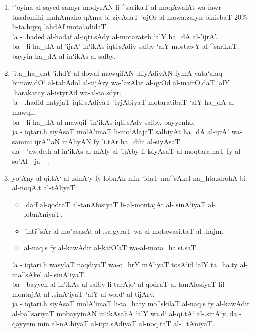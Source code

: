 \begin{enumerate}
    \item `"oyina al-sayed samyr modyrAN li-^sarikaT al-moqAwalAt wa-fawr
        tasalomihi mahAmaho qAma bi-ziyAdaT 'ojOr al-mowa.zafyn binisbaT 20\%
        li-ta.hqyq 'ahdAf mota`adidaT.\\
        'a - .haded al-hadaf al-iqti.sAdy al-motarateb `alY ha_dA al-'ijrA'.\\
        ba - li-ha_dA al-'ijrA' in`ikAs iqti.sAdiy salby `alY mostawY
            al-^sarikaT. bayyin ha_dA al-in`ikAs al-salby.

    \item 'ita_ha_dat 'i.hdY al-dowal mawqifAN .hiyAdiyAN fymA yata`alaq 
        bimaw.dO` al-tabAdol al-tijAry wa-'azAlat al-qyOd al-mafrO.daT `alY
        .harakatay al-istyrAd wa-al-ta.sdyr.\\
        'a - .hadid natyjaT iqti.sAdiyaT 'iyjAbiyaT motaratibaT `alY ha_dA
            al-mawqif.\\
        ba - li-ha_dA al-mawqif 'in`ikAs iqti.sAdy salby. bayyenho.\\
        ja - iqtari.h siyAsaT molA'imaT li-mo`AlajaT salbiyAt ha_dA al-ijrA'
            wa-sammi ijrA'"aN mAliyAN fy 'i.tAr ha_dihi al-siyAsaT.\\
        da - 'aw.de.h al-in`ikAs al-mAly al-'ijAby li-lsiyAsaT al-moqtara.haT
            fy al-so'Al - ja - .

    \item yo`Any al-qi.tA` al-.sinA`y fy lobnAn min `idaT ma^sAkel na_hta.sirohA
        bi-al-noqA.t al-tAliyaT:
        \begin{itemize}
            \item .da`f al-qodraT al-tanAfosiyaT li-al-montajAt al-.sinA`iyaT
                al-lobnAniyaT.
            \item 'inti^sAr al-mo'asasAt al-.sa.gyraT wa-al-motawasi.taT
                al-.hajm.
            \item al-naq.s fy al-kawAdir al-kafO'aT wa-al-mota_ha.si.saT.
        \end{itemize}
        'a - iqtari.h wasylaT naqdiyaT wa-o_hrY mAliyaT tosA`id `alY ta_ha.ty
            al-ma^sAkel al-.sinA`iyaT.\\
        ba - bayyen al-in`ikAs al-salby li-tarAjo` al-qodraT al-tanAfosiyaT
            lil-montajAt al-.sinA`iyaT `alY al-wa.d` al-tijAry.\\
        ja - iqtari.h siyAsaT molA'imaT li-ta_haty mo^skilaT al-naq.s fy
            al-kawAdir al-ba^sariyaT mobayyinAN in`ikAsahA `alY wa.d` al-qi.tA`
            al-.sinA`y.
        da - qayyem min al-nA.hiyaT al-iqti.sAdiyaT al-noq.taT al-_tAniyaT.
\end{enumerate}
